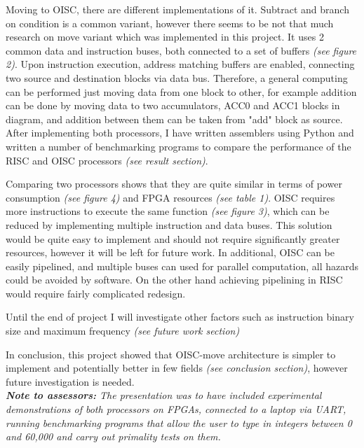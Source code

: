 \documentclass[a4paper,12pt]{article}
\begin{document}
\begin{titlepage}
	Moving to OISC, there are different implementations of it. Subtract and branch on condition is a common variant, however there seems to be not that much research on move variant which was implemented in this project. It uses 2 common data and instruction buses, both connected to a set of buffers \textit{(see figure 2)}. Upon instruction execution, address matching buffers are enabled, connecting two source and destination blocks via data bus. Therefore, a general computing can be performed just moving data from one block to other, for example addition can be done by moving data to two accumulators, ACC0 and ACC1 blocks in diagram, and addition between them can be taken from "add" block as source. 
	\\[-3pt]
	
	After implementing both processors, I have written assemblers using Python and written a number of benchmarking programs to compare the performance of the RISC and OISC processors \textit{(see result section)}. 
	
	Comparing two processors shows that they are quite similar in terms of power consumption \textit{(see figure 4)} and FPGA resources \textit{(see table 1)}. OISC requires more instructions to execute the same function \textit{(see figure 3)}, which can be reduced by implementing multiple instruction and data buses. This solution would be quite easy to implement and should not require significantly greater resources, however it will be left for future work. In additional, OISC can be easily pipelined, and multiple buses can used for parallel computation, all hazards could be avoided by software. On the other hand achieving pipelining in RISC would require fairly complicated redesign.
	
	Until the end of project I will investigate other factors such as instruction binary size and maximum frequency \textit{(see future work section)}

	In conclusion, this project showed that OISC-move architecture is simpler to implement and potentially better in few fields \textit{(see conclusion section)}, however future investigation is needed.
	\\[-3pt]
	
	\textit{ \textbf{Note to assessors: } The presentation was to have included experimental demonstrations of both processors on FPGAs, connected to a laptop via UART, running benchmarking programs that allow the user to type in integers between 0 and 60,000 and carry out primality tests on them.}
	
	\end{titlepage}
\end{document}
